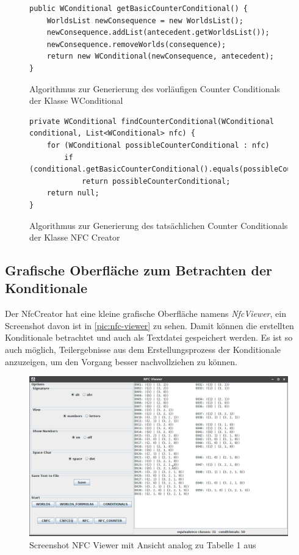 \documentclass[12pt,a4paper]{article}
\begin{document}
\begin{figure}
\begin{lstlisting}
public WConditional getBasicCounterConditional() {
    WorldsList newConsequence = new WorldsList();
    newConsequence.addList(antecedent.getWorldsList());
    newConsequence.removeWorlds(consequence);
    return new WConditional(newConsequence, antecedent);
}
\end{lstlisting}
\caption{Algorithmus zur Generierung des vorläufigen Counter Conditionals der Klasse WConditional}
\label{code:basic-counter}
\end{figure} 


\begin{figure}
\begin{lstlisting}
private WConditional findCounterConditional(WConditional conditional, List<WConditional> nfc) {
    for (WConditional possibleCounterConditional : nfc)
        if (conditional.getBasicCounterConditional().equals(possibleCounterConditional))
            return possibleCounterConditional;
    return null;
}
\end{lstlisting}
\caption{Algorithmus zur Generierung des tatsächlichen Counter Conditionals der Klasse NFC Creator}
\label{code:real-counter}
\end{figure} 



\subsection{Grafische Oberfläche zum Betrachten der Konditionale}


Der NfcCreator hat eine kleine grafische Oberfläche namens \textit{NfcViewer}, ein Screenshot davon ist in \autoref{pic:nfc-viewer} zu sehen. Damit können die erstellten Konditionale betrachtet und auch als Textdatei gespeichert werden. Es ist so auch möglich, Teilergebnisse aus dem Erstellungsprozess der Konditionale anzuzeigen, um den Vorgang besser nachvollziehen zu können.


\begin{figure}
\includegraphics[width=0.9\linewidth]{bilder/nfc-viewer.png}

\caption{Screenshot NFC Viewer mit Ansicht analog zu Tabelle 1 aus \cite{beierle19}}
\label{pic:nfc-viewer}
\end{figure}
\end{document}
